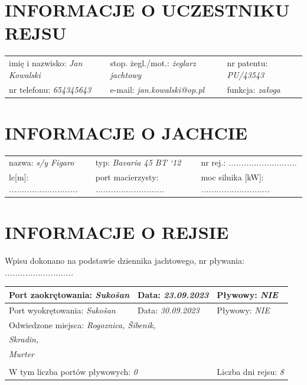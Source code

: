 \documentclass{article}
\begin{document}
\section*{INFORMACJE O UCZESTNIKU REJSU}
\begin{tabularx}{\textwidth}{X X X}
imię i nazwisko: \textit{Jan Kowalski} & stop. żegl./mot.: \textit{żeglarz jachtowy} & nr patentu: \textit{PU/43543} \\
nr telefonu: \textit{654345643} & e-mail: \textit{jan.kowalski@op.pl} & funkcja: \textit{załoga} \\
\end{tabularx}

\section*{INFORMACJE O JACHCIE}

\begin{tabularx}{\textwidth}{X X X}
nazwa: \textit{s/y Figaro} & typ: \textit{Bavaria 45 BT ‘12} & nr rej.: \textit{...........................} \\
lc[m]: \textit{...........................} & port macierzysty: \textit{...........................} & moc silnika [kW]: \textit{...........................} \\
\end{tabularx}

\section*{INFORMACJE O REJSIE}

Wpisu dokonano na podstawie dziennika jachtowego, nr pływania: \textit{...........................}
\\

\begin{tabularx}{\textwidth}{|X|X|X|}
\hline
Port zaokrętowania: \textit{Sukošan} & Data: \textit{23.09.2023} & Pływowy: \textit{NIE} \\
\hline
Port wyokrętowania: \textit{Sukošan} & Data: \textit{30.09.2023} & Pływowy: \textit{NIE} \\
\hline
\multicolumn{3}{|l|}{Odwiedzone miejsca:
\textit{Rogoznica, Šibenik,}\dotfill}\\
\multicolumn{3}{|l|}{\textit{ Skradin,}\dotfill} \\
\multicolumn{3}{|l|}{\textit{ Murter}\dotfill} \\
\multicolumn{3}{|l|}{\dotfill} \\
\hline
\multicolumn{2}{|l|}{W tym liczba portów pływowych: \textit{0}} & Liczba dni rejsu: \textit{8}\\
\hline
\end{tabularx}
\\\\
\end{document}
